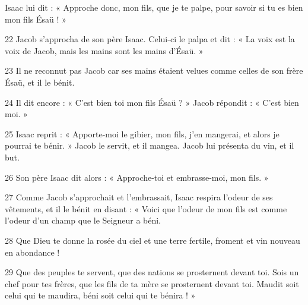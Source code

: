 Isaac lui dit : « Approche donc, mon fils, que je te palpe, pour savoir si tu es bien mon fils Ésaü ! »

22 Jacob s’approcha de son père Isaac. Celui-ci le palpa et dit : « La voix est la voix de Jacob, mais les mains sont les mains d’Ésaü. »

23 Il ne reconnut pas Jacob car ses mains étaient velues comme celles de son frère Ésaü, et il le bénit.

24 Il dit encore : « C’est bien toi mon fils Ésaü ? » Jacob répondit : « C’est bien moi. »

25 Isaac reprit : « Apporte-moi le gibier, mon fils, j’en mangerai, et alors je pourrai te bénir. » Jacob le servit, et il mangea. Jacob lui présenta du vin, et il but.

26 Son père Isaac dit alors : « Approche-toi et embrasse-moi, mon fils. »

27 Comme Jacob s’approchait et l’embrassait, Isaac respira l’odeur de ses vêtements, et il le bénit en disant : « Voici que l’odeur de mon fils est comme l’odeur d’un champ que le Seigneur a béni.

28 Que Dieu te donne la rosée du ciel et une terre fertile, froment et vin nouveau en abondance !

29 Que des peuples te servent, que des nations se prosternent devant toi. Sois un chef pour tes frères, que les fils de ta mère se prosternent devant toi. Maudit soit celui qui te maudira, béni soit celui qui te bénira ! »